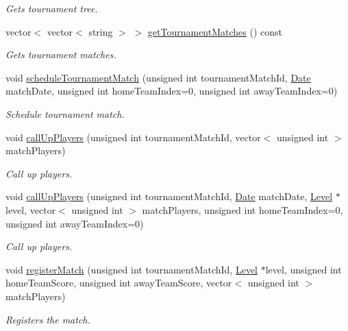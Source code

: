 \begin{DoxyCompactItemize}
\begin{DoxyCompactList}\small\item\em Gets tournament tree. \end{DoxyCompactList}\item 
vector$<$ vector$<$ string $>$ $>$ \hyperlink{class_tournament_af7b21e0eff39c9ebcba96f1a319d7f67}{get\+Tournament\+Matches} () const
\begin{DoxyCompactList}\small\item\em Gets tournament matches. \end{DoxyCompactList}\item 
void \hyperlink{class_tournament_a8f132d5b00451d7c65eafd3048e29362}{schedule\+Tournament\+Match} (unsigned int tournament\+Match\+Id, \hyperlink{class_date}{Date} match\+Date, unsigned int home\+Team\+Index=0, unsigned int away\+Team\+Index=0)
\begin{DoxyCompactList}\small\item\em Schedule tournament match. \end{DoxyCompactList}\item 
void \hyperlink{class_tournament_adbc7625a6fab79463241834d05fc5bfb}{call\+Up\+Players} (unsigned int tournament\+Match\+Id, vector$<$ unsigned int $>$ match\+Players)
\begin{DoxyCompactList}\small\item\em Call up players. \end{DoxyCompactList}\item 
void \hyperlink{class_tournament_a15948a541a1675213e52381c6a67f51c}{call\+Up\+Players} (unsigned int tournament\+Match\+Id, \hyperlink{class_date}{Date} match\+Date, \hyperlink{class_level}{Level} $\ast$level, vector$<$ unsigned int $>$ match\+Players, unsigned int home\+Team\+Index=0, unsigned int away\+Team\+Index=0)
\begin{DoxyCompactList}\small\item\em Call up players. \end{DoxyCompactList}\item 
void \hyperlink{class_tournament_aa795dcb0ac03da77e9b916d8ef19bd63}{register\+Match} (unsigned int tournament\+Match\+Id, \hyperlink{class_level}{Level} $\ast$level, unsigned int home\+Team\+Score, unsigned int away\+Team\+Score, vector$<$ unsigned int $>$ match\+Players)
\begin{DoxyCompactList}\small\item\em Registers the match. \end{DoxyCompactList}\item 

\end{DoxyCompactItemize}
